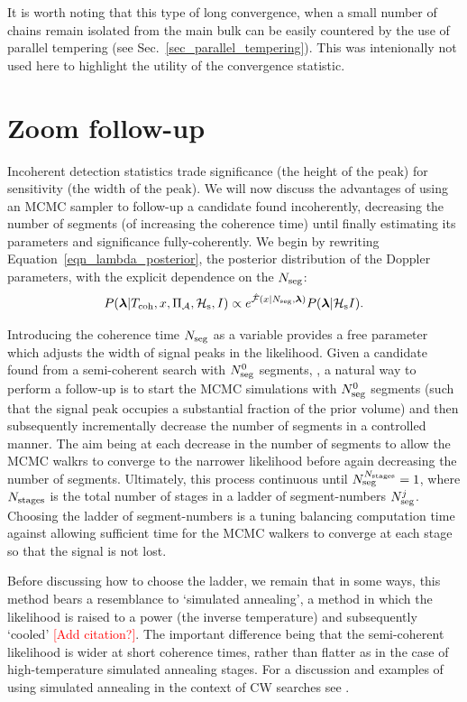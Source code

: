\documentclass[aps, prd, twocolumn, superscriptaddress, floatfix, showpacs, nofootinbib, longbibliography]{revtex4-1}
\newcommand{\comment}[1]{\textcolor{red}{[#1]}}
\begin{document}
It is worth noting that this type of long convergence, when a small number of
chains remain isolated from the main bulk can be easily countered by the use
of parallel tempering (see Sec.~\ref{sec_parallel_tempering}). This was intenionally
not used here to highlight the utility of the convergence statistic.


\section{Zoom follow-up}
\label{sec_follow_up}

Incoherent detection statistics trade significance (the height of the peak) for
sensitivity (the width of the peak). We will now discuss the advantages of
using an MCMC sampler to follow-up a candidate found incoherently, decreasing
the number of segments (of increasing
the coherence time) until finally estimating its parameters and significance
fully-coherently. We begin by rewriting Equation~\eqref{eqn_lambda_posterior},
the posterior distribution of the Doppler parameters, with the explicit
dependence on the $N_{\rm seg}$:
\begin{equation}
P(\boldsymbol{\mathbf{\lambda}} | T_{\rm coh}, x, \Pi_\mathcal{A}, \mathcal{H}_{\rm s}, I)
\propto e^{\hat{{\mathcal{F}}}(x| N_{\rm seg}, \boldsymbol{\mathbf{\lambda}})} P(\boldsymbol{\mathbf{\lambda}}| \mathcal{H}_{\rm s} I).
\end{equation}

Introducing the coherence time $N_{\rm seg}$ as a variable provides a free parameter
which adjusts the width of signal peaks in the likelihood. Given a candidate
found from a semi-coherent search with $N_{\rm seg}^{0}$ segments, , a natural way to
perform a follow-up is to start the MCMC simulations with $N_{\rm seg}^{0}$ segments
(such that the signal peak occupies a substantial fraction of the prior volume)
and then subsequently incrementally decrease the number of segments in a
controlled manner. The aim being at each decrease in the number of segments to
allow the MCMC walkrs to converge to the narrower likelihood before again
decreasing the number of segments. Ultimately, this process continuous until
$N_{\rm seg}^{N_{\rm stages}}=1$, where $N_{\rm stages}$ is the total number of stages in  a
ladder of segment-numbers $N_{\rm seg}^{j}$. Choosing the ladder of segment-numbers
is a tuning balancing computation time against allowing sufficient
time for the MCMC walkers to converge at each stage so that the signal is not
lost.

Before discussing how to choose the ladder, we remain that in some ways, this
method bears a resemblance to `simulated annealing', a method in which the
likelihood is raised to a power (the inverse temperature) and subsequently
`cooled' \comment{Add citation?}. The important difference being that the
semi-coherent likelihood is wider at short coherence times, rather than flatter
as in the case of high-temperature simulated annealing stages. For a discussion
and examples of using simulated annealing in the context of CW searches see
\citet{veitch2007}.
\end{document}
